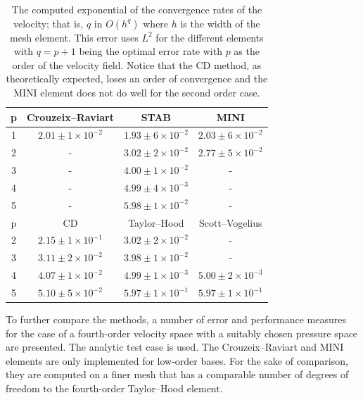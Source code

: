 \begin{table}
  \caption{The computed exponential of the convergence rates of the
  velocity; that is, $q$ in $O(h^q)$ where $h$ is the width of the mesh
  element. This error uses $L^2$ for the different elements with $q=p+1$
  being the optimal error rate with $p$ as the order of the velocity
  field.  Notice that the CD method, as theoretically expected, loses
  an order of convergence and the MINI element does not do well for the
  second order case. }
  \label{tab:terrel:vel_error}
  \begin{center}
  \small
  \begin{tabular}{|c|ccc|}
    \hline
    p  & Crouzeix--Raviart &  STAB &  MINI \\
\hline
   1 & $2.01\pm 1 \times 10^{-2}$ & $1.93\pm 6 \times 10^{-2}$ & $2.03\pm 6 \times 10^{-2}$ \\
   2 & -                          & $3.02\pm 2 \times 10^{-2}$ & $2.77\pm 5 \times 10^{-2}$ \\
   3 & -                          & $4.00\pm 1 \times 10^{-2}$ & - \\
   4 & -                          & $4.99\pm 4 \times 10^{-3}$ & - \\
   5 & -                          & $5.98\pm 1 \times 10^{-2}$ & -\\
    \hline
    \hline
    p  &  CD  & Taylor--Hood & Scott--Vogelius \\
\hline
   2 & $2.15 \pm 1 \times 10^{-1}$ & $3.02 \pm 2 \times 10^{-2}$ & -  \\
   3 & $3.11 \pm 2 \times 10^{-2}$ & $3.98 \pm 1 \times 10^{-2}$ & -  \\
   4 & $4.07 \pm 1 \times 10^{-2}$ & $4.99 \pm 1 \times 10^{-3}$ & $5.00 \pm 2 \times 10^{-3}$\\
   5 & $5.10 \pm 5 \times 10^{-2}$ & $5.97 \pm 1 \times 10^{-1}$ & $5.97 \pm 1 \times 10^{-1}$\\
    \hline
   \end{tabular}
  \end{center}
\end{table}

To further compare the methods, a number of error and performance
measures for the case of a fourth-order velocity space with a suitably
chosen pressure space are presented. The analytic test case is used.
The Crouzeix--Raviart and MINI elements are only implemented for low-order
bases. For the sake of comparison, they are computed on a finer mesh
that has a comparable number of degrees of freedom to the fourth-order
Taylor--Hood element.

